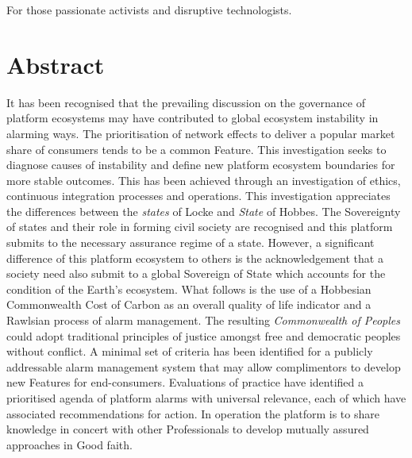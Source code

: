 \documentclass[11pt, oneside]{book}   	%
\begin{document}
\newpage
\thispagestyle{empty}
\mbox{}
\newpage

\vspace*{50mm}
\begin{center}
For those passionate activists and disruptive technologists.
\end{center}

\newpage
\thispagestyle{empty}
\mbox{}
\newpage

\chapter*{Abstract}
It has been recognised that the prevailing discussion on the governance of platform ecosystems may have contributed to global ecosystem instability in alarming ways.
The prioritisation of network effects to deliver a popular market share of consumers tends to be a common Feature.
This investigation seeks to diagnose causes of instability and define new platform ecosystem boundaries for more stable outcomes.
This has been achieved through an investigation of ethics, continuous integration processes and operations.
This investigation appreciates the differences between the \emph{states} of Locke and \emph{State} of Hobbes.
The Sovereignty of states and their role in forming civil society are recognised and this platform submits to the necessary assurance regime of a state.
However, a significant difference of this platform ecosystem to others is the acknowledgement that a society need also submit to a global Sovereign of State which accounts for the condition of the Earth's ecosystem.
What follows is the use of a Hobbesian Commonwealth Cost of Carbon as an overall quality of life indicator and a Rawlsian process of alarm management.
The resulting \emph{Commonwealth of Peoples} could adopt traditional principles of justice amongst free and democratic peoples without conflict.
A minimal set of criteria has been identified for a publicly addressable alarm management system that may allow complimentors to develop new Features for end-consumers.
Evaluations of practice have identified a prioritised agenda of platform alarms with universal relevance, each of which have associated recommendations for action.
In operation the platform is to share knowledge in concert with other Professionals to develop mutually assured approaches in Good faith.

\newpage
\thispagestyle{empty}
\mbox{}
\newpage
\end{document}
